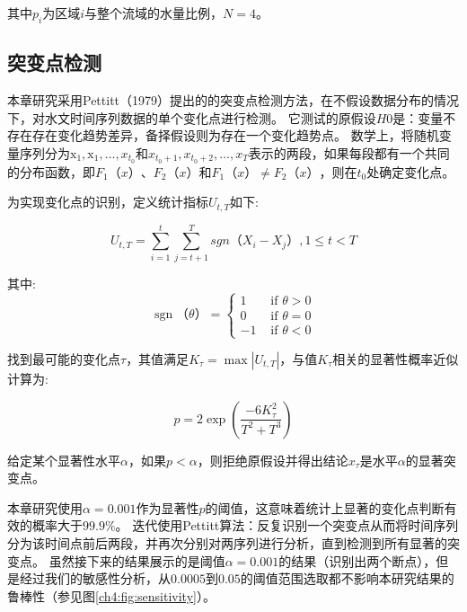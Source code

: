 其中$p_{i}$为区域$i$与整个流域的水量比例，$N=4$。

\subsection{突变点检测}

本章研究采用Pettitt（1979）提出的的突变点检测方法，在不假设数据分布的情况下，对水文时间序列数据的单个变化点进行检测\cite{pettitt1979}。
它测试的原假设$H0$是：变量不存在存在变化趋势差异，备择假设则为存在一个变化趋势点。
数学上，将随机变量序列分为$\mathrm{x}_{1}, \mathrm{x}_{1}, \ldots, x_{t_{0}}$和$x_{t_{0}+1}, x_{t_{0}+2}, \ldots, x_{T}$表示的两段，如果每段都有一个共同的分布函数，即$F_1（x）$、$F_2（x）$和$F_1（x） \neq F_2（x）$，则在$t_0$处确定变化点。

为实现变化点的识别，定义统计指标$U_{t,T}$如下:

\begin{equation}
    U_{t, T} = \sum_{i=1}^t\sum_{j=t+1}^T sgn（X_i - X_j）, 1 \leq t < T
\end{equation}

其中:
\begin{equation}
    \operatorname{sgn}（\theta）= \begin{cases}1 & \text { if } \theta>0 \\ 0 & \text { if } \theta=0 \\ -1 & \text { if } \theta<0\end{cases}
\end{equation}

找到最可能的变化点$\tau$，其值满足$K_{\tau} = \max|U_{t, T}|$，与值$K_{\tau}$相关的显著性概率近似计算为:

\begin{equation}
    p=2 \exp \left(\frac{-6 K_{\tau}^{2}}{T^{2}+T^{3}}\right)
\end{equation}

给定某个显著性水平$\alpha$，如果$p < \alpha$，则拒绝原假设并得出结论$x_{\tau}$是水平$\alpha$的显著突变点。

本章研究使用$\alpha = 0.001$作为显著性$p$的阈值，这意味着统计上显著的变化点判断有效的概率大于$99.9\%$。
迭代使用Pettitt算法：反复识别一个突变点从而将时间序列分为该时间点前后两段，并再次分别对两序列进行分析，直到检测到所有显著的突变点。
虽然接下来的结果展示的是阈值$\alpha = 0.001$的结果（识别出两个断点），但是经过我们的敏感性分析，从$0.0005$到$0.05$的阈值范围选取都不影响本研究结果的鲁棒性（参见图\ref{ch4:fig:sensitivity}）。

